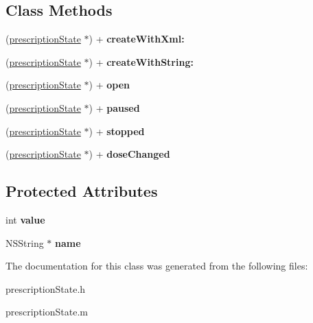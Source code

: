 \subsection*{Class Methods}
\begin{DoxyCompactItemize}
\item 
\hypertarget{interfaceprescription_state_a0db66d872e768091f33f3564d302297c}{}(\hyperlink{interfaceprescription_state}{prescription\+State} $\ast$) + {\bfseries create\+With\+Xml\+:}\label{interfaceprescription_state_a0db66d872e768091f33f3564d302297c}

\item 
\hypertarget{interfaceprescription_state_aeecb9918ac380d006acfa8b4611c5192}{}(\hyperlink{interfaceprescription_state}{prescription\+State} $\ast$) + {\bfseries create\+With\+String\+:}\label{interfaceprescription_state_aeecb9918ac380d006acfa8b4611c5192}

\item 
\hypertarget{interfaceprescription_state_a03777884532efb7ebda3f7acb95a4961}{}(\hyperlink{interfaceprescription_state}{prescription\+State} $\ast$) + {\bfseries open}\label{interfaceprescription_state_a03777884532efb7ebda3f7acb95a4961}

\item 
\hypertarget{interfaceprescription_state_a8d20691b8b0b77a3308c4ab92ae7dfcf}{}(\hyperlink{interfaceprescription_state}{prescription\+State} $\ast$) + {\bfseries paused}\label{interfaceprescription_state_a8d20691b8b0b77a3308c4ab92ae7dfcf}

\item 
\hypertarget{interfaceprescription_state_a7baf06c5196cb97b241265a8c26e4f52}{}(\hyperlink{interfaceprescription_state}{prescription\+State} $\ast$) + {\bfseries stopped}\label{interfaceprescription_state_a7baf06c5196cb97b241265a8c26e4f52}

\item 
\hypertarget{interfaceprescription_state_a3dcdfe33fe61685e1d002b1594393a84}{}(\hyperlink{interfaceprescription_state}{prescription\+State} $\ast$) + {\bfseries dose\+Changed}\label{interfaceprescription_state_a3dcdfe33fe61685e1d002b1594393a84}

\end{DoxyCompactItemize}
\subsection*{Protected Attributes}
\begin{DoxyCompactItemize}
\item 
\hypertarget{interfaceprescription_state_afac0c6eb762f5e3e7eeacf8b7aa7651c}{}int {\bfseries value}\label{interfaceprescription_state_afac0c6eb762f5e3e7eeacf8b7aa7651c}

\item 
\hypertarget{interfaceprescription_state_a1eefdccbdc065727f4b27badaa037149}{}N\+S\+String $\ast$ {\bfseries name}\label{interfaceprescription_state_a1eefdccbdc065727f4b27badaa037149}

\end{DoxyCompactItemize}


The documentation for this class was generated from the following files\+:\begin{DoxyCompactItemize}
\item 
prescription\+State.\+h\item 
prescription\+State.\+m\end{DoxyCompactItemize}
